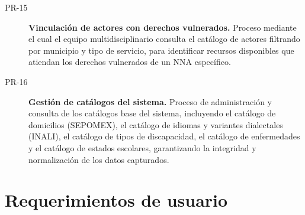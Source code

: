 \begin{description}
	\item[PR-15] \textbf{Vinculación de actores con derechos vulnerados.} 
	Proceso mediante el cual el equipo multidisciplinario consulta el catálogo 
	de actores filtrando por municipio y tipo de servicio, para identificar 
	recursos disponibles que atiendan los derechos vulnerados de un NNA 
	específico.
	
	\item[PR-16] \textbf{Gestión de catálogos del sistema.} Proceso de 
	administración y consulta de los catálogos base del sistema, incluyendo 
	el catálogo de domicilios (SEPOMEX), el catálogo de idiomas y variantes 
	dialectales (INALI), el catálogo de tipos de discapacidad, el catálogo 
	de enfermedades y el catálogo de estados escolares, garantizando la 
	integridad y normalización de los datos capturados.
\end{description}





\section{Requerimientos de usuario}

